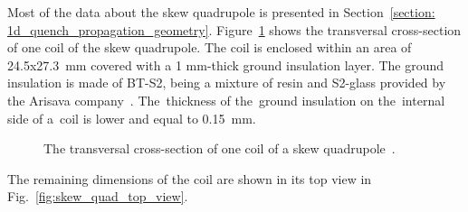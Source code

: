 
Most of the data about the skew quadrupole is presented in Section~\ref{section: 1d_quench_propagation_geometry}. Figure~\ref{fig:skew_quad_transversal_cross_section} shows the transversal cross-section of one coil of the skew quadrupole. The coil is enclosed within an area of 24.5x27.3~mm covered with a 1 mm-thick ground insulation layer. The ground insulation is made of BT-S2, being a mixture of resin and S2-glass provided by the Arisava company~\cite{arisawa_company}. The~thickness of the~ground insulation on the~internal side of a~coil is lower and equal to 0.15~mm.

\begin{figure}[H]
    \centering
    \caption{The transversal cross-section of one coil of a skew quadrupole~\cite{samuele_mariotto_mails}.}
    \label{fig:skew_quad_transversal_cross_section}
\end{figure}

The remaining dimensions of the coil are shown in its top view in Fig.~\ref{fig:skew_quad_top_view}.

